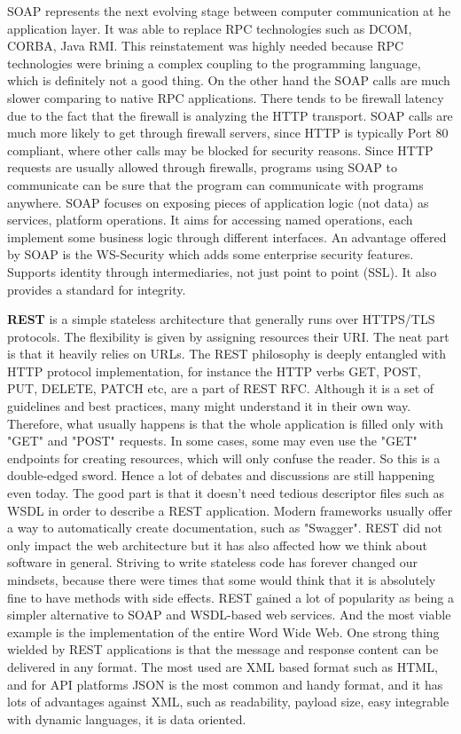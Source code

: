 SOAP represents the next evolving stage between computer communication at he application layer. It was able to replace RPC technologies such as DCOM, CORBA, Java RMI. This reinstatement was highly needed because RPC technologies were brining a complex coupling to the programming language, which is definitely not a good thing. On the other hand the SOAP calls are much slower comparing to native RPC applications. There tends to be firewall latency due to the fact that the firewall is analyzing the HTTP transport. SOAP calls are much more likely to get through firewall servers, since HTTP is typically Port 80 compliant, where other calls may be blocked for security reasons. Since HTTP requests are usually allowed through firewalls, programs using SOAP to communicate can be sure that the program can communicate with programs anywhere. SOAP focuses on exposing pieces of application logic (not data) as services, platform operations. It aims for accessing named operations, each implement some business logic through different interfaces. An advantage offered by SOAP is the WS-Security which adds some enterprise security features. Supports identity through intermediaries, not just point to point (SSL). It also provides a standard for integrity.

\textbf{REST} is a simple stateless architecture that generally runs over HTTPS/TLS protocols. The flexibility is given by assigning resources their URI. The neat part is that it heavily relies on URLs. The REST philosophy is deeply entangled with HTTP protocol implementation, for instance the HTTP verbs GET, POST, PUT, DELETE, PATCH etc, are a part of REST RFC. Although it is a set of guidelines and best practices, many might understand it in their own way. Therefore, what usually happens is that the whole application is filled only with "GET" and "POST" requests. In some cases, some may even use the "GET" endpoints for creating resources, which will only confuse the reader. So this is a double-edged sword. Hence a lot of debates and discussions are still happening even today. The good part is that it doesn't need tedious descriptor files such as WSDL in order to describe a REST application. Modern frameworks usually offer a way to automatically create documentation, such as "Swagger". REST did not only impact the web architecture but it has also affected how we think about software in general. Striving to write stateless code has forever changed our mindsets, because there were times that some would think that it is absolutely fine to have methods with side effects. REST gained a lot of popularity as being a simpler alternative to SOAP and WSDL-based web services. And the most viable example is the implementation of the entire Word Wide Web. One strong thing wielded by REST applications is that the message and response content can be delivered in any format. The most used are XML based format such as HTML, and for API platforms JSON is the most common and handy format, and it has lots of advantages against XML, such as readability, payload size, easy integrable with dynamic languages, it is data oriented.

